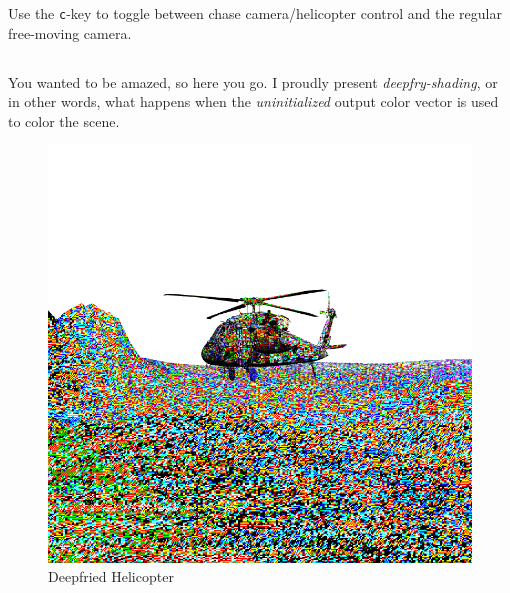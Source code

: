 \documentclass[]{article}
\begin{document}
\begin{multicols}{2}
Use the \texttt{c}-key to toggle between chase camera/helicopter control and the regular free-moving camera.

\setcounter{subsection}{5}
\subsection{}
You wanted to be amazed, so here you go. I proudly present \textit{deepfry-shading}, or in other words, what happens when the \textit{uninitialized} output color vector is used to color the scene.
\begin{figure}[H]
\centering
\includegraphics[width=0.7\columnwidth]{deepfry}
\caption{Deepfried Helicopter}
\label{fig:deepfry}
\end{figure}

\end{multicols}
\end{document}

